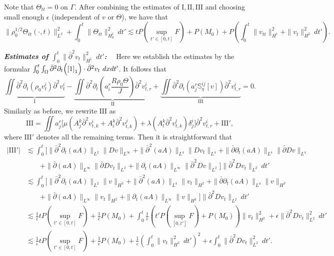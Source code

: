 \documentclass[12pt,a4paper]{amsart}
\numberwithin{equation}{section}
\theoremstyle{plain}
\theoremstyle{definition}
\newcommand{\bpartial}{\bar{\partial}}
\begin{document}
Note that $\Theta_{tt}=0$ on $\Gamma$.
After combining the estimates of $\mathrm{I}, \mathrm{II}, \mathrm{III}$ 
and choosing small enough $\epsilon$ (independent of $v$ or $\Theta$), 
we have that
\begin{equation}\label{thetatt}
\|\rho_0^{1/2}\Theta_{tt}(\cdot,t)\|^2_{L^2}+\int_{0}^{t}\|\Theta_{tt}\|_{H_0^1}^2\ dt'
\lesssim tP(\sup\limits_{t'\in[0,t]}F)+P(M_0)+P\left(\int_{0}^{t}\|v_{tt}\|_{H^1}^2+\|v_t\|_{H^2}^2\ dt'\right).
\end{equation}

\vspace{0.3cm}
\textsl{\textbf{Estimates of $\int_{0}^{t}\|\bpartial^2 v_{t}\|_{H^1}^2\ dt'$:}}~~
Here we establish the estimates by the formular $\int_{0}^{t}\int_{\Omega}\bpartial^2\partial_t \Big(\eqref{1}_1\Big)\cdot \bpartial^2 v_{t}\ dx dt'$. It follows that
$$
\underbrace{\iint \bpartial^2\partial_t(\rho_0 v_t^i) \bpartial^2 v_t^i}_{\mathrm{I}}
-\underbrace{\iint \bpartial^2 \partial_t (a^r_i\frac{R\rho_0\Theta}{J}) \bpartial^2 v^i_{t,r}}_{\mathrm{II}}
+\underbrace{\iint \bpartial^2\partial_t (a^r_j\mathbb{S}^{ij}_{\eta}[v]) \bpartial^2v^i_{t,r}}_{\mathrm{III}}=0.
$$
Similarly as before, we rewrite $\mathrm{III}$ as
$$
\mathrm{III}=\iint a^r_j\Big[\mu (A^{k}_j \bpartial^2 v^i_{t,k}+A^k_i \bpartial^2 v^j_{t,k})
+\lambda (A_l^k \bpartial^2 v^l_{t,k})\delta^i_j\Big]
\bpartial^2 v^i_{t,r}+\mathrm{III}',
$$
where $\mathrm{III}'$ denotes all the remaining terms. Then it is straightforward that 
\begin{align*}
|\mathrm{III}'|&\lesssim  \int_{0}^{t}  \Big[\|\bpartial^2\partial_t(aA)\|_{L^2}\|Dv\|_{L^{\infty}}
  +\|\bpartial^2 (aA)\|_{L^4} \|Dv_t\|_{L^4}
  +\|\bpartial\partial_t (aA) \|_{L^4} \|\bpartial Dv\|_{L^4}\\
  &\qquad
  +\|\bpartial (aA)\|_{L^{\infty}}\|\bpartial Dv_t\|_{L^2}
  +\|\partial_t(aA)\|_{L^{\infty}} \|\bpartial^2 Dv\|_{L^2}
  \Big]\|\bpartial^2 Dv_{t}\|_{L^2}\ dt'\\
&\lesssim  \int_{0}^{t}  \Big[\|\bpartial^2\partial_t(aA)\|_{L^2} \|v\|_{H^3}
  +\|\bpartial^2 (aA)\|_{L^4} \|v_t\|_{H^2}
  +\|\bpartial\partial_t (aA) \|_{L^4} \|v\|_{H^3}\\
  &\qquad
  +\|\bpartial (aA)\|_{L^{\infty}} \|v_t\|_{H^2}
  +\|\partial_t(aA)\|_{L^{\infty}} \|v\|_{H^3}
  \Big]\|\bpartial^2 Dv_{t}\|_{L^2}\ dt'\\
&\lesssim\frac{1}{\epsilon} tP(\sup\limits_{t'\in[0,t]} F)+\frac{1}{\epsilon}P(M_0)
  +\int_{0}^{t} \frac{1}{\epsilon}(t'P(\sup\limits_{[0,t']}F)+P(M_0)) \|v_t\|_{H^2}^2 
  +\epsilon\|\bpartial^2 Dv_{t}\|_{L^2}^2\ dt'\\
&\lesssim \frac{1}{\epsilon}tP(\sup\limits_{t'\in[0,t]}F)+\frac{1}{\epsilon}P(M_0)
  +\frac{1}{\epsilon}\left(  \int_{0}^{t}\|v_t\|_{H^2}^2 \ dt'\right)^2
  +\epsilon\int_{0}^{t}\|\bpartial^2 Dv_{t}\|_{L^2}^2\ dt'.
\end{align*}
\end{document}
